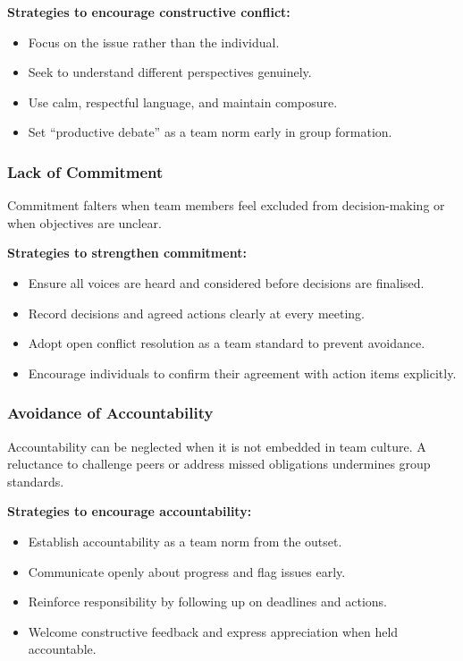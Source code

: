 \documentclass{article}
\begin{document}
\textbf{Strategies to encourage constructive conflict:}
\begin{itemize}
    \item Focus on the issue rather than the individual.
    \item Seek to understand different perspectives genuinely.
    \item Use calm, respectful language, and maintain composure.
    \item Set “productive debate” as a team norm early in group formation.
\end{itemize}

\subsubsection{Lack of Commitment}

Commitment falters when team members feel excluded from decision-making or when objectives are unclear.

\vspace{1em}
\textbf{Strategies to strengthen commitment:}
\begin{itemize}
    \item Ensure all voices are heard and considered before decisions are finalised.
    \item Record decisions and agreed actions clearly at every meeting.
    \item Adopt open conflict resolution as a team standard to prevent avoidance.
    \item Encourage individuals to confirm their agreement with action items explicitly.
\end{itemize}

\subsubsection{Avoidance of Accountability}

Accountability can be neglected when it is not embedded in team culture. A reluctance to challenge peers or address missed obligations undermines group standards.

\vspace{1em}
\textbf{Strategies to encourage accountability:}
\begin{itemize}
    \item Establish accountability as a team norm from the outset.
    \item Communicate openly about progress and flag issues early.
    \item Reinforce responsibility by following up on deadlines and actions.
    \item Welcome constructive feedback and express appreciation when held accountable.
\end{itemize}
\end{document}
